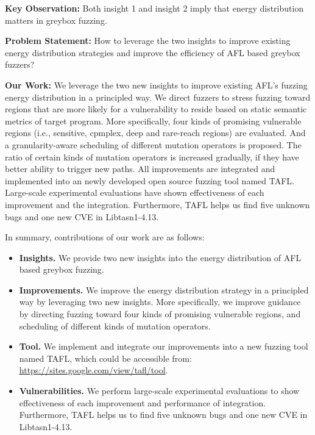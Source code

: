 \textbf{Key Observation:} Both insight 1 and insight 2 imply that energy distribution matters in greybox fuzzing.

\textbf{Problem Statement:} How to leverage the two insights to improve existing energy distribution strategies and improve the efficiency of AFL based greybox fuzzers?

\textbf{Our Work:} We leverage the two new insights to improve existing AFL's fuzzing energy distribution in a principled way. We direct fuzzers to stress fuzzing toward regions that are more likely for a vulnerability to reside based on static semantic metrics of target program. More specifically, four kinds of promising vulnerable regions (i.e., sensitive, cpmplex, deep and rare-reach regions) are evaluated. And a granularity-aware scheduling of different mutation operators is proposed. The ratio of certain kinds of mutation operators is increased gradually, if they have better ability to trigger new paths. All improvements are integrated and implemented into an newly developed open source fuzzing tool named TAFL. Large-scale experimental evaluations have shown effectiveness of each improvement and the integration. Furthermore, TAFL helps us find five unknown bugs and one new CVE in Libtasn1-4.13\cite{bugs}.

In summary, contributions of our work are as follows:

\begin{itemize}
    \item \textbf{Insights.} We provide two new insights into the energy distribution of AFL based greybox fuzzing.
    
    \item \textbf{Improvements.} We improve the energy distribution strategy in a principled way by leveraging two new insights. More specifically, we improve guidance by directing fuzzing toward four kinds of promising vulnerable regions, and scheduling of different kinds of mutation operators.
    
    \item \textbf{Tool.} We implement and integrate our improvements into a new fuzzing tool named TAFL, which could be accessible from: 
              \url{https://sites.google.com/view/tafl/tool}.
    
    \item  \textbf{Vulnerabilities.} We perform large-scale experimental evaluations to show effectiveness of each improvement and performance of integration. Furthermore, TAFL helps us to find five unknown bugs and one new CVE in Libtasn1-4.13.

\end{itemize}

